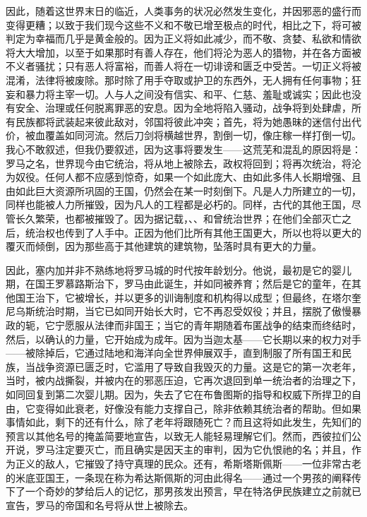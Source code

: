 因此，随着这世界末日的临近，人类事务的状况必然发生变化，并因邪恶的盛行而变得更糟；以致于我们现今这些不义和不敬已增至极点的时代，相比之下，将可被判定为幸福而几乎是黄金般的。因为正义将如此减少，而不敬、贪婪、私欲和情欲将大大增加，以至于如果那时有善人存在，他们将沦为恶人的猎物，并在各方面被不义者骚扰；只有恶人将富裕，而善人将在一切诽谤和匮乏中受苦。一切正义将被混淆，法律将被废除。那时除了用手夺取或护卫的东西外，无人拥有任何事物；狂妄和暴力将主宰一切。人与人之间没有信实、和平、仁慈、羞耻或诚实；因此也没有安全、治理或任何脱离罪恶的安息。因为全地将陷入骚动，战争将到处肆虐，所有民族都将武装起来彼此敌对，邻国将彼此冲突；首先，将为她愚昧的迷信付出代价，被血覆盖如同河流。然后刀剑将横越世界，割倒一切，像庄稼一样打倒一切。我心不敢叙述，但我仍要叙述，因为这事将要发生——这荒芜和混乱的原因将是：罗马之名，世界现今由它统治，将从地上被除去，政权将回到；将再次统治，将沦为奴役。任何人都不应感到惊奇，如果一个如此庞大、由如此多伟人长期增强、且由如此巨大资源所巩固的王国，仍然会在某一时刻倒下。凡是人力所建立的一切，同样也能被人力所摧毁，因为凡人的工程都是必朽的。同样，古代的其他王国，尽管长久繁荣，也都被摧毁了。因为据记载，、、和曾统治世界；在他们全部灭亡之后，统治权也传到了人手中。正因为他们比所有其他王国更大，所以也将以更大的覆灭而倾倒，因为那些高于其他建筑的建筑物，坠落时具有更大的力量。\par

因此，塞内加并非不熟练地将罗马城的时代按年龄划分。他说，最初是它的婴儿期，在国王罗慕路斯治下，罗马由此诞生，并如同被养育；然后是它的童年，在其他国王治下，它被增长，并以更多的训诲制度和机构得以成型；但最终，在塔尔奎尼乌斯统治时期，当它已如同开始长大时，它不再忍受奴役；并且，摆脱了傲慢暴政的轭，它宁愿服从法律而非国王；当它的青年期随着布匿战争的结束而终结时，然后，以确认的力量，它开始成为成年。因为当迦太基——它长期以来的权力对手——被除掉后，它通过陆地和海洋向全世界伸展双手，直到制服了所有国王和民族，当战争资源已匮乏时，它滥用了导致自我毁灭的力量。这是它的第一次老年，当时，被内战撕裂，并被内在的邪恶压迫，它再次退回到单一统治者的治理之下，如同回复到第二次婴儿期。因为，失去了它在布鲁图斯的指导和权威下所捍卫的自由，它变得如此衰老，好像没有能力支撑自己，除非依赖其统治者的帮助。但如果事情如此，剩下的还有什么，除了老年将跟随死亡？而且这将如此发生，先知们的预言以其他名号的掩盖简要地宣告，以致无人能轻易理解它们。然而，西彼拉们公开说，罗马注定要灭亡，而且确实是因天主的审判，因为它仇恨祂的名；并且，作为正义的敌人，它摧毁了持守真理的民众。还有，希斯塔斯佩斯——一位非常古老的米底亚国王，一条现在称为希达斯佩斯的河由此得名——通过一个男孩的阐释传下了一个奇妙的梦给后人的记忆，那男孩发出预言，早在特洛伊民族建立之前就已宣告，罗马的帝国和名号将从世上被除去。\par

